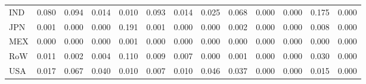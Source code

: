 \begin{table}[htbp]
\begin{tabular}{lcccccccccccc}
  IND & \textcolor[RGB]{19,12,236}{0.080} & \textcolor[RGB]{11,7,244}{0.094} & \textcolor[RGB]{68,44,187}{0.014} & \textcolor[RGB]{72,47,183}{0.010} & \textcolor[RGB]{13,8,242}{0.093} & \textcolor[RGB]{64,41,191}{0.014} & \textcolor[RGB]{53,34,202}{0.025} & \textcolor[RGB]{25,16,230}{0.068} & \textcolor[RGB]{255,165,0}{0.000} & \textcolor[RGB]{255,165,0}{0.000} & \textcolor[RGB]{4,3,251}{0.175} & \textcolor[RGB]{255,165,0}{0.000} \\ 
  JPN & \textcolor[RGB]{106,69,149}{0.001} & \textcolor[RGB]{255,165,0}{0.000} & \textcolor[RGB]{255,165,0}{0.000} & \textcolor[RGB]{2,1,253}{0.191} & \textcolor[RGB]{104,67,151}{0.001} & \textcolor[RGB]{255,165,0}{0.000} & \textcolor[RGB]{255,165,0}{0.000} & \textcolor[RGB]{96,62,159}{0.002} & \textcolor[RGB]{255,165,0}{0.000} & \textcolor[RGB]{255,165,0}{0.000} & \textcolor[RGB]{81,52,174}{0.008} & \textcolor[RGB]{255,165,0}{0.000} \\ 
  MEX & \textcolor[RGB]{255,165,0}{0.000} & \textcolor[RGB]{255,165,0}{0.000} & \textcolor[RGB]{255,165,0}{0.000} & \textcolor[RGB]{102,66,153}{0.001} & \textcolor[RGB]{255,165,0}{0.000} & \textcolor[RGB]{255,165,0}{0.000} & \textcolor[RGB]{255,165,0}{0.000} & \textcolor[RGB]{255,165,0}{0.000} & \textcolor[RGB]{255,165,0}{0.000} & \textcolor[RGB]{255,165,0}{0.000} & \textcolor[RGB]{255,165,0}{0.000} & \textcolor[RGB]{255,165,0}{0.000} \\ 
  RoW & \textcolor[RGB]{70,45,185}{0.011} & \textcolor[RGB]{94,61,162}{0.002} & \textcolor[RGB]{89,58,166}{0.004} & \textcolor[RGB]{8,5,246}{0.110} & \textcolor[RGB]{79,51,176}{0.009} & \textcolor[RGB]{83,54,172}{0.007} & \textcolor[RGB]{255,165,0}{0.000} & \textcolor[RGB]{98,63,157}{0.001} & \textcolor[RGB]{255,165,0}{0.000} & \textcolor[RGB]{255,165,0}{0.000} & \textcolor[RGB]{47,30,208}{0.030} & \textcolor[RGB]{255,165,0}{0.000} \\ 
  USA & \textcolor[RGB]{59,38,196}{0.017} & \textcolor[RGB]{28,18,227}{0.067} & \textcolor[RGB]{38,25,217}{0.040} & \textcolor[RGB]{74,48,181}{0.010} & \textcolor[RGB]{85,55,170}{0.007} & \textcolor[RGB]{77,50,178}{0.010} & \textcolor[RGB]{36,23,219}{0.046} & \textcolor[RGB]{42,27,212}{0.037} & \textcolor[RGB]{255,165,0}{0.000} & \textcolor[RGB]{255,165,0}{0.000} & \textcolor[RGB]{62,40,193}{0.015} & \textcolor[RGB]{255,165,0}{0.000} \\ 
   \hline
\end{tabular}
\end{table}
